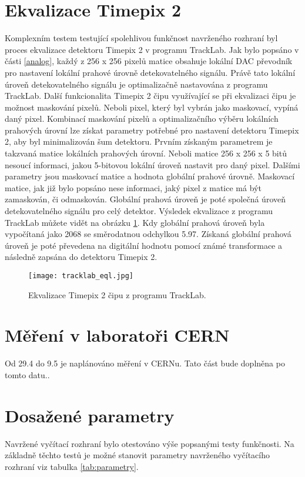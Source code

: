 \section{Ekvalizace Timepix 2}
	Komplexním testem testující spolehlivou funkčnost navrženého rozhraní byl proces ekvalizace detektoru Timepix 2 v programu TrackLab. Jak bylo popsáno v části \ref{analog}, každý z 256 x 256 pixelů matice obsahuje lokální DAC převodník pro nastavení lokální prahové úrovně detekovatelného signálu. Právě tato lokální úroveň detekovatelného signálu je optimalizačně nastavována z programu TrackLab. Další funkcionalita Timepix 2 čipu využívající se při ekvalizaci čipu je možnost maskování pixelů. Neboli pixel, který byl vybrán jako maskovací, vypíná daný pixel. Kombinací maskování pixelů a optimalizačního výběru lokálních prahových úrovní lze získat parametry potřebné pro nastavení detektoru Timepix 2, aby byl minimalizován šum detektoru. Prvním získaným parametrem je takzvaná matice lokálních prahových úrovní. Neboli matice 256 x 256 x 5 bitů nesoucí informaci, jakou 5-bitovou lokální úroveň nastavit pro daný pixel. Dalšími parametry jsou maskovací matice a hodnota globální prahové úrovně. Maskovací matice, jak již bylo popsáno nese informaci, jaký pixel z matice má být zamaskován, či odmaskován. Globální prahová úroveň je poté společná úroveň detekovatelného signálu pro celý detektor. Výsledek ekvalizace z programu TrackLab můžete vidět na obrázku \ref{fig:tracklab_eql}. Kdy globální prahová úroveň byla vypočítaná jako 2068 se směrodatnou odchylkou 5.97. Získaná globální prahová úroveň je poté převedena na digitální hodnotu pomocí známé transformace a následně zapsána do detektoru Timepix 2.
	\begin{figure}[h!]
		\centering
		\captionsetup{justification=centering}
		\texttt{[image: tracklab\_eql.jpg]}
		\caption{Ekvalizace Timepix 2 čipu z programu TrackLab.} 
		\label{fig:tracklab_eql}
	\end{figure}

\section{Měření v laboratoři CERN}
	Od 29.4 do 9.5 je naplánováno měření v CERNu. Tato část bude doplněna po tomto datu..


\section{Dosažené parametry}
Navržené vyčítací rozhraní bylo otestováno výše popsanými testy funkčnosti. Na základně těchto testů je možné stanovit parametry navrženého vyčítacího rozhraní viz tabulka \ref{tab:parametry}.

